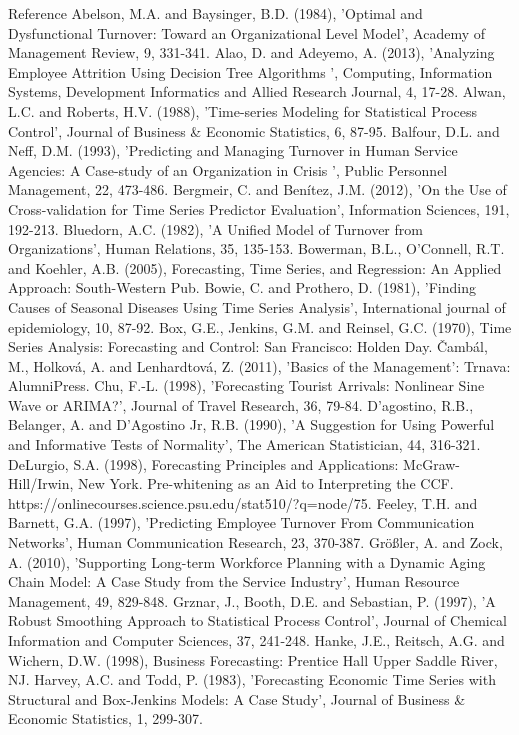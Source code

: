 Reference 
Abelson, M.A. and Baysinger, B.D. (1984), 'Optimal and Dysfunctional Turnover: Toward an Organizational Level Model', Academy of Management Review, 9, 331-341.
Alao, D. and Adeyemo, A. (2013), 'Analyzing Employee Attrition Using Decision Tree Algorithms ', Computing, Information Systems, Development Informatics and Allied Research Journal, 4, 17-28.
Alwan, L.C. and Roberts, H.V. (1988), 'Time-series Modeling for Statistical Process Control', Journal of Business & Economic Statistics, 6, 87-95.
Balfour, D.L. and Neff, D.M. (1993), 'Predicting and Managing Turnover in Human Service Agencies: A Case-study of an Organization in Crisis ', Public Personnel Management, 22, 473-486.
Bergmeir, C. and Benítez, J.M. (2012), 'On the Use of Cross-validation for Time Series Predictor Evaluation', Information Sciences, 191, 192-213.
Bluedorn, A.C. (1982), 'A Unified Model of Turnover from Organizations', Human Relations, 35, 135-153.
Bowerman, B.L., O'Connell, R.T. and Koehler, A.B. (2005), Forecasting, Time Series, and Regression: An Applied Approach: South-Western Pub.
Bowie, C. and Prothero, D. (1981), 'Finding Causes of Seasonal Diseases Using Time Series Analysis', International journal of epidemiology, 10, 87-92.
Box, G.E., Jenkins, G.M. and Reinsel, G.C. (1970), Time Series Analysis: Forecasting and Control: San Francisco: Holden Day.
Čambál, M., Holková, A. and Lenhardtová, Z. (2011), 'Basics of the Management': Trnava: AlumniPress.
Chu, F.-L. (1998), 'Forecasting Tourist Arrivals: Nonlinear Sine Wave or ARIMA?', Journal of Travel Research, 36, 79-84.
D'agostino, R.B., Belanger, A. and D'Agostino Jr, R.B. (1990), 'A Suggestion for Using Powerful and Informative Tests of Normality', The American Statistician, 44, 316-321.
DeLurgio, S.A. (1998), Forecasting Principles and Applications: McGraw-Hill/Irwin, New York.
Pre-whitening as an Aid to Interpreting the CCF. https://onlinecourses.science.psu.edu/stat510/?q=node/75.
Feeley, T.H. and Barnett, G.A. (1997), 'Predicting Employee Turnover From Communication Networks', Human Communication Research, 23, 370-387.
Größler, A. and Zock, A. (2010), 'Supporting Long-term Workforce Planning with a Dynamic Aging Chain Model: A Case Study from the Service Industry', Human Resource Management, 49, 829-848.
Grznar, J., Booth, D.E. and Sebastian, P. (1997), 'A Robust Smoothing Approach to Statistical Process Control', Journal of Chemical Information and Computer Sciences, 37, 241-248.
Hanke, J.E., Reitsch, A.G. and Wichern, D.W. (1998), Business Forecasting: Prentice Hall Upper Saddle River, NJ.
Harvey, A.C. and Todd, P. (1983), 'Forecasting Economic Time Series with Structural and Box-Jenkins Models: A Case Study', Journal of Business & Economic Statistics, 1, 299-307.
